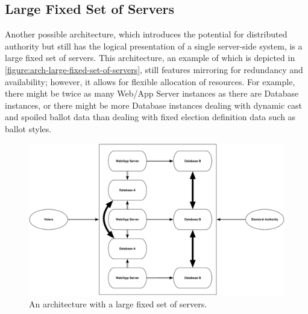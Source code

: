 \subsection{Large Fixed Set of Servers}

Another possible architecture, which introduces the potential for
distributed authority but still has the logical presentation of a
single server-side system, is a large fixed set of servers. This
architecture, an example of which is depicted in
\autoref{figure:arch-large-fixed-set-of-servers}, still features
mirroring for redundancy and availability; however, it allows for
flexible allocation of resources. For example, there might be twice as
many Web/App Server instances as there are Database instances, or
there might be more Database instances dealing with dynamic cast and
spoiled ballot data than dealing with fixed election definition data
such as ballot styles.

\begin{figure}[p]
\begin{center}
\includegraphics[width=5.5in]{architecture_resources/large-fixed-set-of-servers.pdf}
\end{center}
\caption{An architecture with a large fixed set of servers.}
\label{figure:arch-large-fixed-set-of-servers}
\end{figure}

